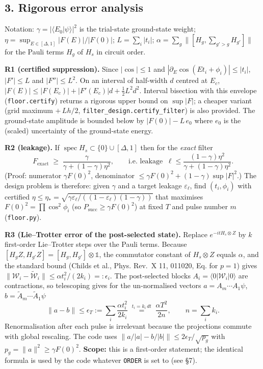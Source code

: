 \documentclass[
]{article}
\begin{document}
\hypertarget{rigorous-error-analysis}{%
\subsection{3. Rigorous error analysis}\label{rigorous-error-analysis}}

Notation: \(\gamma=|\langle E_0|\psi\rangle|^2\) is the trial-state
ground-state weight; \(\eta=\sup_{E\in[\Delta,1]}|F(E)|/|F(0)|\);
\(L=\sum_i|t_i|\); \(\alpha=\sum_g\big\|[H_g,\sum_{g'>g}H_{g'}]\big\|\)
for the Pauli terms \(H_g\) of \(H_s\) in circuit order.

\textbf{R1 (certified suppression).} Since \(|\cos|\le1\) and
\(|\partial_E\cos(Et_i+\phi_i)|\le|t_i|\), \(|F'|\le L\) and
\(|F''|\le L^2\). On an interval of half-width \(d\) centred at \(E_c\),
\(|F(E)|\le|F(E_c)|+|F'(E_c)|d+\tfrac12L^2d^2\). Interval bisection with
this envelope (\texttt{floor.certify}) returns a rigorous upper bound on
\(\sup|F|\); a cheaper variant (grid maximum \(+\,Lh/2\),
\texttt{filter\_design.certify\_filter}) is also provided. The
ground-state amplitude is bounded below by \(|F(0)|-L\,e_0\) where
\(e_0\) is the (scaled) uncertainty of the ground-state energy.

\textbf{R2 (leakage).} If
\(\operatorname{spec}H_s\subset\{0\}\cup[\Delta,1]\) then for the
\emph{exact} filter \[
F_{\mathrm{exact}}\;\ge\;\frac{\gamma}{\gamma+(1-\gamma)\eta^2},\qquad\text{i.e. leakage }\ \ell\le\frac{(1-\gamma)\eta^2}{\gamma+(1-\gamma)\eta^2}.
\] (Proof: numerator \(\gamma F(0)^2\), denominator
\(\le\gamma F(0)^2+(1-\gamma)\sup|F|^2\).) The design problem is
therefore: given \(\gamma\) and a target leakage \(\varepsilon_\ell\),
find \((t_i,\phi_i)\) with certified
\(\eta\le\eta_*=\sqrt{\gamma\varepsilon_\ell/((1-\varepsilon_\ell)(1-\gamma))}\)
that maximises \(F(0)^2=\prod\cos^2\phi_i\) (so
\(P_{\mathrm{succ}}\ge\gamma F(0)^2\)) at fixed \(T\) and pulse number
\(m\) (\texttt{floor.py}).

\textbf{R3 (Lie--Trotter error of the post-selected state).} Replace
\(e^{-itH_s\otimes Z}\) by \(k\) first-order Lie--Trotter steps over the
Pauli terms. Because \([H_gZ,H_{g'}Z]=[H_g,H_{g'}]\otimes\mathbb 1\),
the commutator constant of \(H_s\otimes Z\) equals \(\alpha\), and the
standard bound (Childs et al., Phys. Rev.~X 11, 011020, Eq. for \(p=1\))
gives
\(\|\mathcal W_i-\widetilde{\mathcal W}_i\|\le\alpha t_i^2/(2k_i)=:\epsilon_i\).
The post-selected blocks \(A_i=\langle0|\mathcal W_i|0\rangle\) are
contractions, so telescoping gives for the un-normalised vectors
\(a=A_m\cdots A_1\psi\), \(b=\tilde A_m\cdots\tilde A_1\psi\) \[
\|a-b\|\le\epsilon_T:=\sum_i\frac{\alpha t_i^2}{2k_i}\;\overset{t_i=k_i\,dt}{=}\;\frac{\alpha T^2}{2n},\qquad n=\sum_ik_i .
\] Renormalisation after each pulse is irrelevant because the
projections commute with global rescaling. The code uses
\(\|a/|a|-b/|b|\|\le2\epsilon_T/\sqrt{p_g}\) with
\(p_g=\|a\|^2\ge\gamma F(0)^2\). \textbf{Scope:} this is a first-order
statement; the identical formula is used by the code whatever
\texttt{ORDER} is set to (see §7).
\end{document}
